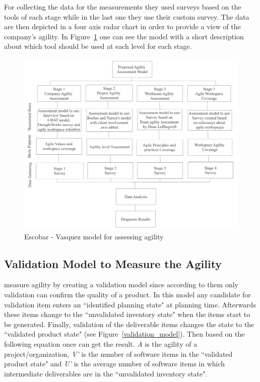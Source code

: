 For collecting the data for the measurements they used surveys based on the tools of each stage while in the last one they use their custom survey. The data are then depicted in a four axis radar chart in order to provide a view of the company's agility. In Figure~\ref{escobar_model} one can see the model with a short description about which tool should be used at each level for each stage.

\begin{figure} [H]
\centerline{\includegraphics[scale=0.75]{include/relatedwork/fig/escobar_model.pdf}}
\caption{Escobar - Vasquez model for assessing agility} 
\label{escobar_model}
\end{figure}

\subsection{Validation Model to Measure the Agility}
\citet{validation_model} measure agility by creating a validation model since according to them only validation can confirm the quality of a product. In this model any candidate for validation item enters an ``identified planning state" at planning time. Afterwards these items change to the ``unvalidated inventory state" when the items start to be generated. Finally, validation of the deliverable items changes the state to the ``validated product state" (see Figure~\ref{validation_model}). Then based on the following equation once can get the result. \textit{A} is the agility of a project/organization, \textit{V'} is the number of software items in the ``validated product state" and \textit{U'} is the average number of software items in which intermediate deliverables are in the ``unvalidated inventory state".

